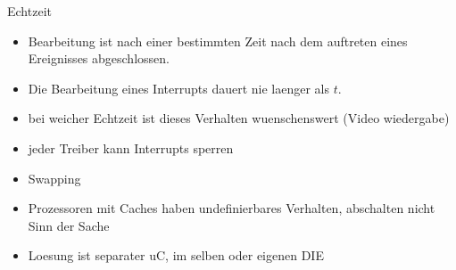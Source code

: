\begin{frame}{Echtzeit}
	\begin{itemize}
		\item Bearbeitung ist nach einer bestimmten Zeit nach dem auftreten eines Ereignisses abgeschlossen.
		\item Die Bearbeitung eines Interrupts dauert nie laenger als $t$.
		\item bei weicher Echtzeit ist dieses Verhalten wuenschenswert (Video wiedergabe)
		\item jeder Treiber kann Interrupts sperren
		\item Swapping
		\item Prozessoren mit Caches haben undefinierbares Verhalten, abschalten nicht Sinn der Sache
		\item Loesung ist separater uC, im selben oder eigenen DIE
	\end{itemize}
\end{frame}
